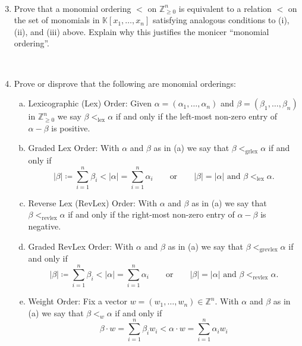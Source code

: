 \documentclass[12pt]{amsart}
\theoremstyle{definition}
\newcommand{\KK}{\mathbb{K}}
\newcommand{\ZZ}{\mathbb{Z}}
\DeclareMathOperator{\lex}{lex}
\DeclareMathOperator{\revlex}{revlex}
\DeclareMathOperator{\grlex}{grlex}
\DeclareMathOperator{\grevlex}{grevlex}
\begin{document}
\ \\

\begin{enumerate}
\setcounter{enumi}{2}

\item Prove that a monomial ordering $<$ on $\ZZ^{n}_{\geq0}$ is equivalent to a relation $<$ on the set of monomials in $\KK[x_1,\ldots,x_n]$ satisfying analogous conditions to (i), (ii), and (iii) above. Explain why this justifies the monicer ``monomial ordering''.

\ \\

\item Prove or disprove that the following are monomial orderings:
\begin{enumerate}[(a)]
	\item Lexicographic (Lex) Order: Given $\alpha=(\alpha_1,\ldots,\alpha_n)$ and $\beta=(\beta_1,\ldots,\beta_n)$ in $\ZZ^{n}_{\geq0}$ we say  $\beta <_{\lex} \alpha$ if and only if the left-most non-zero entry of $\alpha-\beta$ is positive.
	\item Graded Lex Order: With $\alpha$ and $\beta$ as in (a) we say that $\beta <_{\grlex} \alpha$ if and only if
	\[
	|\beta| \coloneqq \sum_{i=1}^{n} \beta_i < |\alpha| = \sum_{i=1}^{n} \alpha_{i} \quad \quad \text{or} \quad \quad |\beta| = |\alpha| \text{ and } \beta <_{\lex} \alpha.
	\]
	\item Reverse Lex (RevLex) Order: With $\alpha$ and $\beta$ as in (a) we say that $\beta <_{\revlex} \alpha$ if and only if the right-most non-zero entry of $\alpha-\beta$ is negative.
	\item Graded RevLex Order: With $\alpha$ and $\beta$ as in (a) we say that $\beta <_{\grevlex} \alpha$ if and only if
	\[
	|\beta| \coloneqq \sum_{i=1}^{n} \beta_i < |\alpha| = \sum_{i=1}^{n} \alpha_{i} \quad \quad \text{or} \quad \quad |\beta| = |\alpha| \text{ and } \beta <_{\revlex} \alpha.
	\]
	\item Weight Order: Fix a vector $w=(w_1,\ldots,w_n) \in \ZZ^{n}$. With $\alpha$ and $\beta$ as in (a) we say that $\beta <_{w} \alpha$ if and only if
	\[
	\beta\cdot w = \sum_{i=1}^{n}\beta_i w_i< \alpha \cdot w = \sum_{i=1}^{n} \alpha_i w_i
	\]
\end{enumerate}
\end{enumerate}
\ \\
\end{document}
